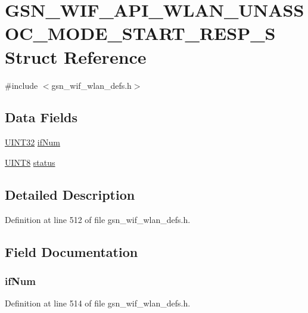 \hypertarget{a00316}{
\section{GSN\_\-WIF\_\-API\_\-WLAN\_\-UNASSOC\_\-MODE\_\-START\_\-RESP\_\-S Struct Reference}
\label{a00316}
}


{\ttfamily \#include $<$gsn\_\-wif\_\-wlan\_\-defs.h$>$}

\subsection*{Data Fields}
\begin{DoxyCompactItemize}
\item 
\hyperlink{a00660_gae1e6edbbc26d6fbc71a90190d0266018}{UINT32} \hyperlink{a00316_ab582fd779b13f74e06e2491389a60aa0}{ifNum}
\item 
\hyperlink{a00660_gab27e9918b538ce9d8ca692479b375b6a}{UINT8} \hyperlink{a00316_ac4f6d5d1544a8d2c1309479ffe1b61ab}{status}
\end{DoxyCompactItemize}


\subsection{Detailed Description}


Definition at line 512 of file gsn\_\-wif\_\-wlan\_\-defs.h.



\subsection{Field Documentation}
\hypertarget{a00316_ab582fd779b13f74e06e2491389a60aa0}{
\subsubsection[{ifNum}]{ {\bf ifNum}}}
\label{a00316_ab582fd779b13f74e06e2491389a60aa0}


Definition at line 514 of file gsn\_\-wif\_\-wlan\_\-defs.h.

